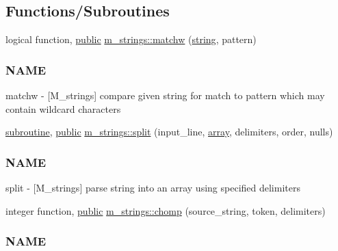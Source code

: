 \subsection*{Functions/\+Subroutines}
\begin{DoxyCompactItemize}
\item 
logical function, \hyperlink{M__stopwatch_83_8txt_a2f74811300c361e53b430611a7d1769f}{public} \hyperlink{namespacem__strings_a1f9a363d0432f7373ef6a388f5893b0e}{m\+\_\+strings\+::matchw} (\hyperlink{what__overview_81_8txt_a74cb7e955273b9f9157b4f0c18a38849}{string}, pattern)
\begin{DoxyCompactList}\small\item\em \subsubsection*{N\+A\+ME}

matchw -\/ \mbox{[}M\+\_\+strings\mbox{]} compare given string for match to pattern which may contain wildcard characters \end{DoxyCompactList}\item 
\hyperlink{M__stopwatch_83_8txt_acfbcff50169d691ff02d4a123ed70482}{subroutine}, \hyperlink{M__stopwatch_83_8txt_a2f74811300c361e53b430611a7d1769f}{public} \hyperlink{namespacem__strings_a3f0119fab962146c7656cad592dd9acd}{m\+\_\+strings\+::split} (input\+\_\+line, \hyperlink{intro__blas1_83_8txt_a89db1945e1a335ab0184c6a097821e32}{array}, delimiters, order, nulls)
\begin{DoxyCompactList}\small\item\em \subsubsection*{N\+A\+ME}

split -\/ \mbox{[}M\+\_\+strings\mbox{]} parse string into an array using specified delimiters \end{DoxyCompactList}\item 
integer function, \hyperlink{M__stopwatch_83_8txt_a2f74811300c361e53b430611a7d1769f}{public} \hyperlink{namespacem__strings_aa3fc15a665eeff512b7f5269029f558d}{m\+\_\+strings\+::chomp} (source\+\_\+string, token, delimiters)
\begin{DoxyCompactList}\small\item\em \subsubsection*{N\+A\+ME}


\end{DoxyCompactList}
\end{DoxyCompactItemize}
